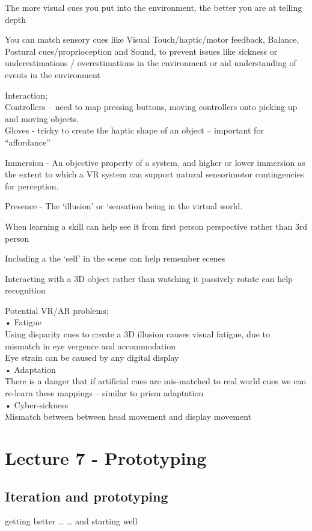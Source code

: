\documentclass[]{project_plan}
\begin{document}
The more visual cues you put into the environment, the better you are at telling depth

You can match sensory cues like Visual Touch/haptic/motor feedback,  Balance,  Postural cues/proprioception and
Sound, to prevent issues like sickness or underestimations / overestimations in the environment or aid understanding of events in the environment

Interaction;\\
Controllers – need to map pressing buttons, moving controllers onto picking up and moving objects.\\
Gloves - tricky to create the haptic shape of an object – important for “affordance”

Immersion - An objective property of
a system, and higher or lower
immersion as the extent to which a VR
system can support natural
sensorimotor contingencies for
perception.

Presence - The ‘illusion’ or ‘sensation
being in the virtual world.

When learning a skill can help see it from first person perspective rather than 3rd person

Including a the ‘self’ in the scene can help remember scenes

Interacting with a 3D object rather than watching it passively rotate can help recognition

Potential VR/AR problems;\\
• Fatigue\\
Using disparity cues to create a 3D illusion causes visual fatigue, due to mismatch in eye
vergence and accommodation\\
Eye strain can be caused by any digital display\\
• Adaptation\\
There is a danger that if artificial cues are mis-matched to real world cues we can re-learn
these mappings – similar to prism adaptation\\
• Cyber-sickness\\
Mismatch between between head movement and display movement

\chapter{Lecture 7 - Prototyping}
\section{Iteration and prototyping}
getting better … … and starting well
\end{document}
